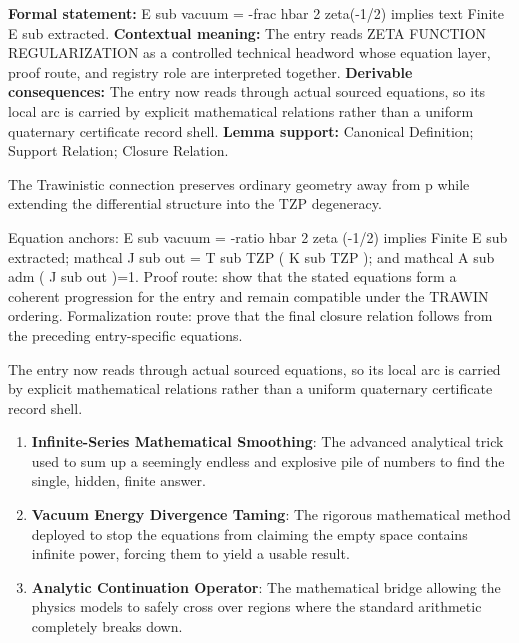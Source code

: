 \begingroup\footnotesize\setlength{\emergencystretch}{3em}\sloppy
\textbf{Formal statement:} E sub vacuum = -frac hbar 2 zeta(-1/2) implies text Finite E sub extracted. \textbf{Contextual meaning:} The entry reads ZETA FUNCTION REGULARIZATION as a controlled technical headword whose equation layer, proof route, and registry role are interpreted together. \textbf{Derivable consequences:} The entry now reads through actual sourced equations, so its local arc is carried by explicit mathematical relations rather than a uniform quaternary certificate record shell. \textbf{Lemma support:} Canonical Definition; Support Relation; Closure Relation.\par
\endgroup

The Trawinistic connection preserves ordinary geometry away from p while extending the differential structure into the TZP degeneracy.

Equation anchors: E sub vacuum = -ratio hbar 2 zeta (-1/2) implies Finite E sub extracted; mathcal J sub out = T sub TZP ( K sub TZP ); and mathcal A sub adm ( J sub out )=1. Proof route: show that the stated equations form a coherent progression for the entry and remain compatible under the TRAWIN ordering. Formalization route: prove that the final closure relation follows from the preceding entry-specific equations.

The entry now reads through actual sourced equations, so its local arc is carried by explicit mathematical relations rather than a uniform quaternary certificate record shell.
\endgroup

\begin{enumerate}[leftmargin=1.6em,itemsep=6pt,topsep=4pt]
\item \textbf{Infinite-Series Mathematical Smoothing}: The advanced analytical trick used to sum up a seemingly endless and explosive pile of numbers to find the single, hidden, finite answer.
\item \textbf{Vacuum Energy Divergence Taming}: The rigorous mathematical method deployed to stop the equations from claiming the empty space contains infinite power, forcing them to yield a usable result.
\item \textbf{Analytic Continuation Operator}: The mathematical bridge allowing the physics models to safely cross over regions where the standard arithmetic completely breaks down.
\end{enumerate}

